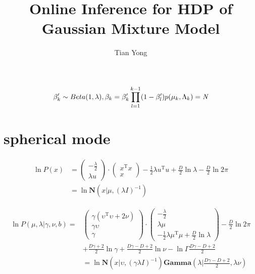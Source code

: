 \documentclass{article}
\begin{document}
\title{Online Inference for HDP of Gaussian Mixture Model}
\author{Tian Yong}
\maketitle
\begin{equation}
\beta_k' \sim Beta(1, \lambda),
\beta_k = \beta'_k\prod_{l=1}^{k-1}(1-\beta'_l)
p(\mu_k, \Lambda_k) = \emph{N}
\end{equation}
\section{spherical mode}
$$
\begin{aligned}
\ln P(x)& =
\left(
    \begin{aligned}
        - \frac{\lambda}{2}\\
        \lambda u
    \end{aligned}
\right)
\cdot
\left(
    \begin{aligned}
        x^\mathrm{T}x\\
        x
    \end{aligned}
\right) -\frac{1}{2}\lambda u ^ \mathrm{T} u + \frac{D}{2} \ln \lambda - \frac{D}{2} \ln2\pi \\
& = \ln\textbf{N}(x|\mu,(\lambda I)^{-1})
\end{aligned}
$$



$$
\begin{aligned}
\ln P(\mu,\lambda | \gamma, \nu, b) =
&\left(
    \begin{aligned}
        \gamma(\upsilon^\mathrm{T}\upsilon + 2\nu)\\
        \gamma \upsilon\\
        \gamma
    \end{aligned}
\right)
\cdot
\left(
    \begin{aligned}
        - \frac{\lambda}{2}\\
        \lambda \mu\\
        -\frac{1}{2}\lambda \mu ^ \mathrm{T} \mu + \frac{D}{2} \ln \lambda
    \end{aligned}
\right)
- \frac{D}{2}\ln2\pi \\
&+ \frac{D\gamma + 2}{2}\ln\gamma
+ \frac{D\gamma-D+2}{2}\ln \nu
 - \ln\Gamma\frac{D\gamma -D + 2}{2}\\
& = \ln\textbf{N}(x|\upsilon, (\gamma \lambda I)^{-1}) \textbf{Gamma}(\lambda | \frac{D \gamma - D + 2}{2}, \lambda \nu)
\end{aligned}
$$
\end{document}
